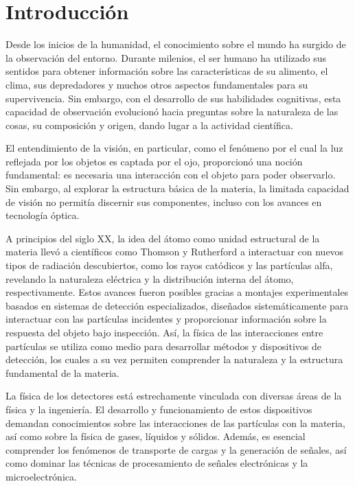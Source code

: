 \documentclass[]{book}
\begin{document}
\chapter{Introducción}

Desde los inicios de la humanidad, el conocimiento sobre el mundo ha surgido de la observación del entorno. Durante milenios, el ser humano ha utilizado sus sentidos para obtener información sobre las características de su alimento, el clima, sus depredadores y muchos otros aspectos fundamentales para su supervivencia. Sin embargo, con el desarrollo de sus habilidades cognitivas, esta capacidad de observación evolucionó hacia preguntas sobre la naturaleza de las cosas, su composición y origen, dando lugar a la actividad científica.

\noindent El entendimiento de la visión, en particular, como el fenómeno por el cual la luz reflejada por los objetos es captada por el ojo, proporcionó una noción fundamental: es necesaria una interacción con el objeto para poder observarlo. Sin embargo, al explorar la estructura básica de la materia, la limitada capacidad de visión no permitía discernir sus componentes, incluso con los avances en tecnología óptica.

\noindent A principios del siglo XX, la idea del átomo como unidad estructural de la materia llevó a científicos como Thomson y Rutherford a interactuar con nuevos tipos de radiación descubiertos, como los rayos catódicos y las partículas alfa, revelando la naturaleza eléctrica y la distribución interna del átomo, respectivamente. Estos avances fueron posibles gracias a montajes experimentales basados en sistemas de detección especializados, diseñados sistemáticamente para interactuar con las partículas incidentes y proporcionar información sobre la respuesta del objeto bajo inspección. Así, la física de las interacciones entre partículas se utiliza como medio para desarrollar métodos y dispositivos de detección, los cuales a su vez permiten comprender la naturaleza y la estructura fundamental de la materia.

\noindent La física de los detectores está estrechamente vinculada con diversas áreas de la física y la ingeniería. 
El desarrollo y funcionamiento de estos dispositivos demandan conocimientos sobre las interacciones de las 
partículas con la materia, así como sobre la física de gases, líquidos y sólidos. Además, es esencial comprender 
los fenómenos de transporte de cargas y la generación de señales, así como dominar las técnicas de procesamiento 
de señales electrónicas y la microelectrónica.
\end{document}
